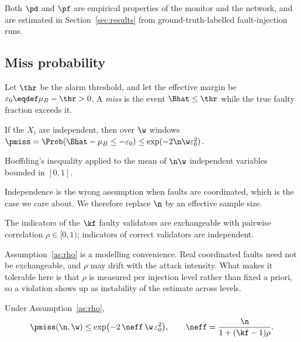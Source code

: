 Both $\pd$ and $\pf$ are empirical properties of the monitor and the network,
and are estimated in Section~\ref{sec:results} from ground-truth-labelled
fault-injection runs.

\subsection{Miss probability}

Let $\thr$ be the alarm threshold, and let the effective margin be
$\varepsilon_{0}\eqdef\mu_{B}-\thr>0$. A \emph{miss} is the event
$\Bhat\le\thr$ while the true faulty fraction exceeds it.

\begin{Lemma}
\label{lem:hoeffding}
If the $X_{i}$ are independent, then over $\w$ windows
$\pmiss=\Prob(\Bhat-\mu_{B}\le-\varepsilon_{0})\le
\exp(-2\n\w\varepsilon_{0}^{2})$.
\end{Lemma}

\begin{Proof}
Hoeffding's inequality \cite{hoeffding1963} applied to the mean of $\n\w$
independent variables bounded in $[0,1]$.
\end{Proof}

Independence is the wrong assumption when faults are coordinated, which is the
case we care about. We therefore replace $\n$ by an effective sample size.

\begin{Assumption}
\label{as:rho}
The indicators of the $\kf$ faulty validators are exchangeable with pairwise
correlation $\rho\in[0,1)$; indicators of correct validators are independent.
\end{Assumption}

Assumption~\ref{as:rho} is a modelling convenience. Real coordinated faults need
not be exchangeable, and $\rho$ may drift with the attack intensity. What makes
it tolerable here is that $\rho$ is measured per injection level rather than
fixed a priori, so a violation shows up as instability of the estimate across
levels.

\begin{State}
\label{st:rho}
Under Assumption~\ref{as:rho},
\begin{equation}
\pmiss(\n,\w)\le\exp\bigl(-2\,\neff\,\w\,\varepsilon_{0}^{2}\bigr),
\qquad
\neff=\frac{\n}{1+(\kf-1)\rho}.
\label{eq:pmiss}
\end{equation}
\end{State}

